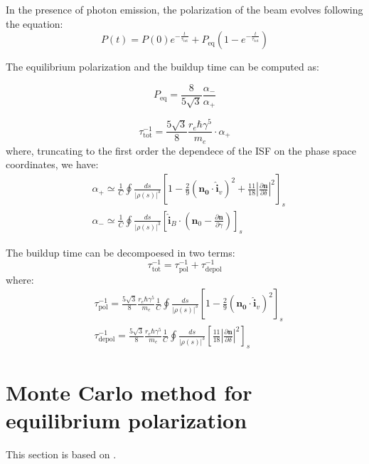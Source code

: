 In the presence of photon emission, the polarization of the beam evolves following
the equation:
\begin{equation}
P(t) = P(0) e^{-\frac{t}{\tau_\text{tot}}} + P_\text{eq} \left(1 - e^{-\frac{t}{\tau_\text{tot}}}\right)
\end{equation}

The equilibrium polarization and the buildup time can be computed as:

\begin{equation}
P_\text{eq} = \frac{8}{5\sqrt{3}} \frac{\alpha_{-}}{\alpha_{+}}
\end{equation}

\begin{equation}
\tau_\text{tot}^{-1} = \frac{5\sqrt{3}}{8} \frac{r_e \hbar \gamma^5}{m_e} \cdot \alpha_+
\end{equation}
where, truncating to the first order the dependece of the ISF on the phase space coordinates, we have:
\begin{align}
&\alpha_+ \simeq \frac{1}{C} \oint \frac{ds}{|\rho(s)|^3}
\left[
1 - \frac{2}{9} (\bm{n_0} \cdot \hat{\bm{i}}_v)^2 + \frac{11}{18} \left|  \frac{\partial \bm{n}}{\partial \delta} \right|^2
\right]_s\\
&\alpha_- \simeq  \frac{1}{C} \oint \frac{ds}{|\rho(s)|^3}
\left[\hat{\bm{i}}_B \cdot
(\bm{n}_0 - \frac{\partial \bm{n}}{\partial \gamma})
\right]_s
\end{align}

The buildup time can be decompoesed in two terms:
\begin{equation}
\tau_\text{tot}^{-1} = \tau_\text{pol}^{-1} + \tau_\text{depol}^{-1}
\end{equation}
where:
\begin{align}
  &\tau_\text{pol}^{-1} = \frac{5\sqrt{3}}{8} \frac{r_e \hbar \gamma^5}{m_e}
  \frac{1}{C} \oint \frac{ds}{|\rho(s)|^3}
  \left[
  1 - \frac{2}{9} (\bm{n_0} \cdot \hat{\bm{i}}_v)^2
  \right]_s\\
  &\tau_\text{depol}^{-1} = \frac{5\sqrt{3}}{8} \frac{r_e \hbar \gamma^5}{m_e}
  \frac{1}{C} \oint \frac{ds}{|\rho(s)|^3}
  \left[
    \frac{11}{18} \left|  \frac{\partial \bm{n}}{\partial \delta} \right|^2
  \right]_s
\end{align}

\section{Monte Carlo method for equilibrium polarization}
This section is based on \cite{Boge:1994we, DUAN201581}.

